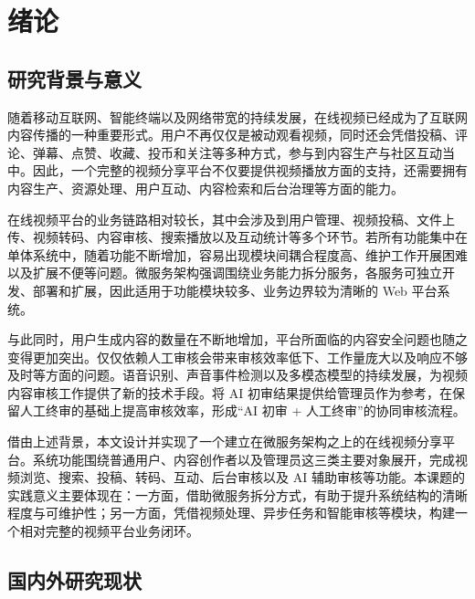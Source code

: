 
\chapter{绪论}
\label{chap:introduction}

\section{研究背景与意义}
\label{sec:research-background}

随着移动互联网、智能终端以及网络带宽的持续发展，在线视频已经成为了互联网内容传播的一种重要形式。用户不再仅仅是被动观看视频，同时还会凭借投稿、评论、弹幕、点赞、收藏、投币和关注等多种方式，参与到内容生产与社区互动当中。因此，一个完整的视频分享平台不仅要提供视频播放方面的支持，还需要拥有内容生产、资源处理、用户互动、内容检索和后台治理等方面的能力。

在线视频平台的业务链路相对较长，其中会涉及到用户管理、视频投稿、文件上传、视频转码、内容审核、搜索播放以及互动统计等多个环节。若所有功能集中在单体系统中，随着功能不断增加，容易出现模块间耦合程度高、维护工作开展困难以及扩展不便等问题。微服务架构强调围绕业务能力拆分服务，各服务可独立开发、部署和扩展，因此适用于功能模块较多、业务边界较为清晰的 Web 平台系统\cite{lewis2014microservices,newman2021building,richardson2018microservices}。

与此同时，用户生成内容的数量在不断地增加，平台所面临的内容安全问题也随之变得更加突出。仅仅依赖人工审核会带来审核效率低下、工作量庞大以及响应不够及时等方面的问题。语音识别、声音事件检测以及多模态模型的持续发展，为视频内容审核工作提供了新的技术手段。将 AI 初审结果提供给管理员作为参考，在保留人工终审的基础上提高审核效率，形成“AI 初审 + 人工终审”的协同审核流程\cite{radford2023whisper,gemmeke2017audioset,bai2023qwen}。

借由上述背景，本文设计并实现了一个建立在微服务架构之上的在线视频分享平台。系统功能围绕普通用户、内容创作者以及管理员这三类主要对象展开，完成视频浏览、搜索、投稿、转码、互动、后台审核以及 AI 辅助审核等功能。本课题的实践意义主要体现在：一方面，借助微服务拆分方式，有助于提升系统结构的清晰程度与可维护性；另一方面，凭借视频处理、异步任务和智能审核等模块，构建一个相对完整的视频平台业务闭环。

\section{国内外研究现状}
\label{sec:research-status}

